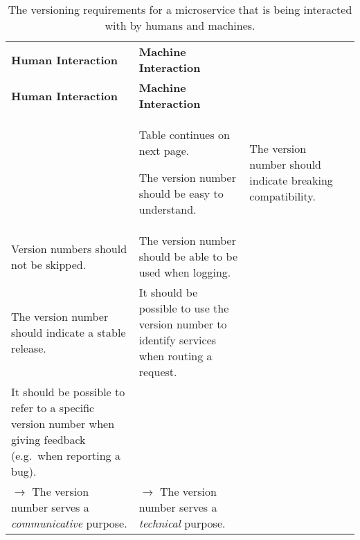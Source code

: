 \begin{longtable}{XXXX}%
\label{tab:versioning_machine_human}
\vspace{0.25cm}\\
\toprule
\textbf{Human Interaction} & \textbf{Machine Interaction} \\ 
\midrule
\endfirsthead
\toprule
\textbf{Human Interaction} & \textbf{Machine Interaction} \\ 
\midrule
\endhead
\midrule
& \hspace*{\fill} \small{Table continues on next page.}
\endfoot
\bottomrule
\caption{The versioning requirements for a microservice that is being interacted with by humans and machines.}
\endlastfoot
The version number should be easy to understand. & The version number should indicate breaking compatibility.\\
Version numbers should not be skipped. & The version number should be able to be used when logging.\\
The version number should indicate a stable release. & It should be possible to use the version number to identify services when routing a request.\\
It should be possible to refer to a specific version number when giving feedback (e.g.\ when reporting a bug). &\\
$\to$ The version number serves a \textit{communicative} purpose. & $\to$ The version number serves a \textit{technical} purpose.
\end{longtable}
